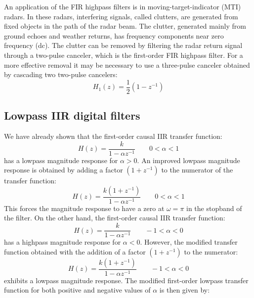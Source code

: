\documentclass[../../main/main.tex]{subfiles}
\begin{document}
An application of the FIR highpass filters is in moving-target-indicator (MTI) radars. In these radars, interfering signals, called clutters, are generated from fixed objects in the path of the radar beam. The clutter, generated mainly from ground echoes and weather returns, has frequency components near zero frequency (dc).
The clutter can be removed by filtering the radar return signal through a two-pulse canceler, which is the first-order FIR highpass filter. For a more effective removal it may be necessary to use a three-pulse canceler obtained by cascading two two-pulse cancelers:
\begin{equation}
    H_{1}(z)
    =
    \frac{1}{2} (1 - z^{-1})
    \label{eq:L19_S32_1}
\end{equation}



\subsection{Lowpass IIR digital filters}
We have already shown that the first-order causal IIR transfer function:
\begin{equation}
    H(z)
    =
    \frac{k}{1 - \alpha z^{-1}}
    \qquad
    0 < \alpha < 1
    \label{eq:L19_S33_1}
\end{equation}
has a lowpass magnitude response for \( \alpha > 0 \).
An improved lowpass magnitude response is obtained by adding a factor \( (1+z^{-1}) \) to the numerator of the transfer function:
\begin{equation}
    H(z)
    =
    \frac{k(1+z^{-1})}{1 - \alpha z^{-1}}
    \qquad
    0 < \alpha < 1
    \label{eq:L19_S34_1}
\end{equation}
This forces the magnitude response to have a zero at \( \omega = \pi \) in the stopband of the filter. On the other hand, the first-order causal IIR transfer function:
\begin{equation}
    H(z)
    =
    \frac{k}{1 - \alpha z^{-1}}
    \qquad
    -1 < \alpha < 0
    \label{eq:L19_S35_1}
\end{equation}
has a highpass magnitude response for \( \alpha < 0 \). However, the modified transfer function obtained with the addition of a factor \( (1+z^{-1}) \) to the numerator:
\begin{equation}
    H(z)
    =
    \frac{k(1+z^{-1})}{1 - \alpha z^{-1}}
    \qquad
    -1 < \alpha < 0
    \label{eq:L19_S36_1}
\end{equation}
exhibits a lowpass magnitude response. The modified first-order lowpass transfer function for both positive and negative values of \( \alpha \) is then given by:
\end{document}
